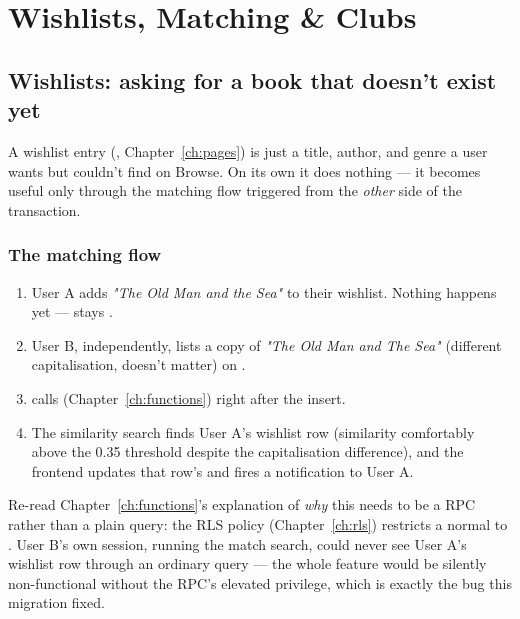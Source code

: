 \chapter{Wishlists, Matching \& Clubs}
\label{ch:wishlists-clubs}

\section{Wishlists: asking for a book that doesn't exist yet}

A wishlist entry (, Chapter~\ref{ch:pages}) is just a title, author, and genre a user wants but couldn't find on Browse. On its own it does nothing — it becomes useful only through the matching flow triggered from the \emph{other} side of the transaction.

\subsection*{The matching flow}

\begin{enumerate}
  \item User A adds \emph{"The Old Man and the Sea"} to their wishlist. Nothing happens yet —  stays .
  \item User B, independently, lists a copy of \emph{"The Old Man and The Sea"} (different capitalisation, doesn't matter) on .
  \item {} calls  (Chapter~\ref{ch:functions}) right after the insert.
  \item The  similarity search finds User A's wishlist row (similarity comfortably above the 0.35 threshold despite the capitalisation difference), and the frontend updates that row's  and fires a notification to User A.
\end{enumerate}

\begin{olknote}
Re-read Chapter~\ref{ch:functions}'s explanation of \emph{why} this needs to be a  RPC rather than a plain query: the  RLS policy (Chapter~\ref{ch:rls}) restricts a normal  to . User B's own session, running the match search, could never see User A's wishlist row through an ordinary query — the whole feature would be silently non-functional without the RPC's elevated privilege, which is exactly the bug this migration fixed.
\end{olknote}

